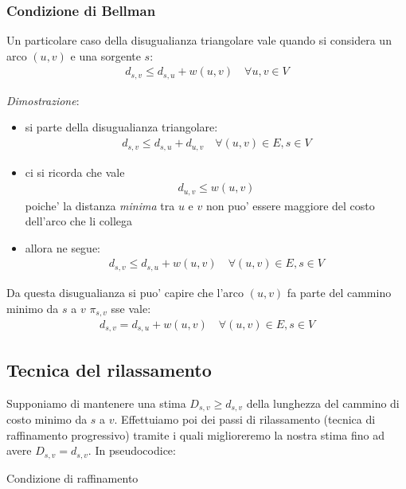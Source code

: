 \documentclass{article}
\begin{document}
\subsubsection{Condizione di Bellman}

Un particolare caso della disugualianza triangolare vale quando si considera
un arco $(u, v)$ e una sorgente $s$:
\begin{align*}
  d_{s,v} \leq d_{s,u} + w(u, v) \quad \forall u, v \in V
\end{align*}

\noindent \emph{Dimostrazione}:
\begin{itemize}
  \item si parte della disugualianza triangolare:
    \begin{align*}
      d_{s,v} \leq d_{s,u} + d_{u,v} \quad \forall (u, v) \in E, s \in V
    \end{align*}
  \item ci si ricorda che vale
    \begin{align*}
      d_{u,v} \leq w(u, v)
    \end{align*}
    poiche' la distanza \emph{minima} tra $u$ e $v$ non puo' essere
    maggiore del costo dell'arco che li collega
  \item allora ne segue:
    \begin{align*}
      d_{s,v} \leq d_{s,u} + w(u, v) \quad \forall (u, v) \in E, s \in V
    \end{align*}
\end{itemize}

Da questa disugualianza si puo' capire che l'arco $(u, v)$ fa parte del cammino
minimo da $s$ a $v$ $\pi_{s,v}$ sse vale:
\begin{align*}
  d_{s,v} = d_{s,u} + w(u, v) \quad \forall (u, v) \in E, s \in V
\end{align*}

\subsection{Tecnica del rilassamento}

Supponiamo di mantenere una stima $D_{s,v} \geq d_{s,v}$ della lunghezza del
cammino di costo minimo da $s$ a $v$. Effettuiamo poi dei passi di rilassamento
(tecnica di raffinamento progressivo) tramite i quali miglioreremo la nostra stima
fino ad avere $D_{s,v} = d_{s,v}$. In pseudocodice:

\begin{algorithm}[H]
  \caption{Condizione di raffinamento}
\end{algorithm}
\end{document}
